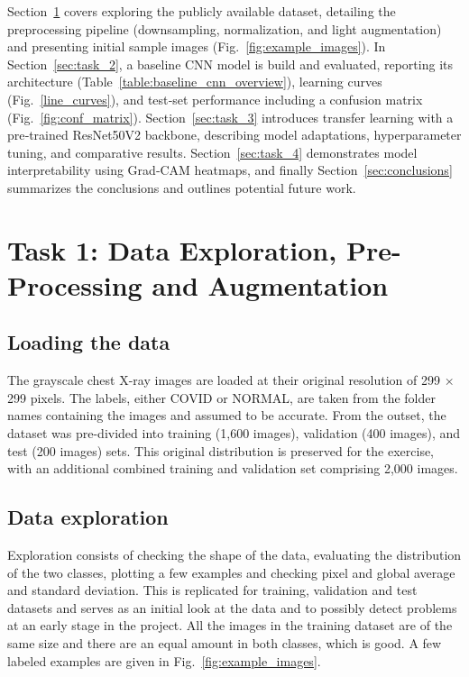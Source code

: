 \documentclass[conference]{IEEEtran}
\begin{document}
Section~\ref{sec:task_1} covers exploring the publicly available dataset, detailing the preprocessing pipeline (downsampling, normalization, and light augmentation) and presenting initial sample images (Fig.~\ref{fig:example_images}). In Section~\ref{sec:task_2}, a baseline CNN model is build and evaluated, reporting its architecture (Table~\ref{table:baseline_cnn_overview}), learning curves (Fig.~\ref{line_curves}), and test‑set performance including a confusion matrix (Fig.~\ref{fig:conf_matrix}). Section~\ref{sec:task_3} introduces transfer learning with a pre‑trained ResNet50V2 backbone, describing model adaptations, hyperparameter tuning, and comparative results. Section~\ref{sec:task_4} demonstrates model interpretability using Grad‑CAM heatmaps, and finally Section~\ref{sec:conclusions} summarizes the conclusions and outlines potential future work.

\section{Task 1: Data Exploration, Pre-Processing and Augmentation}\label{sec:task_1}

\subsection{Loading the data}
The grayscale chest X-ray images are loaded at their original resolution of 299 × 299 pixels. The labels, either COVID or NORMAL, are taken from the folder names containing the images and assumed to be accurate. From the outset, the dataset was pre-divided into training (1,600 images), validation (400 images), and test (200 images) sets. This original distribution is preserved for the exercise, with an additional combined training and validation set comprising 2,000 images.

\subsection{Data exploration}
Exploration consists of checking the shape of the data, evaluating the distribution of the two classes, plotting a few examples and checking pixel and global average and standard deviation. This is replicated for training, validation and test datasets and serves as an initial look at the data and to possibly detect problems at an early stage in the project.
All the images in the training dataset are of the same size and there are an equal amount in both classes, which is good. A few labeled examples are given in Fig.~\ref{fig:example_images}.
\end{document}
